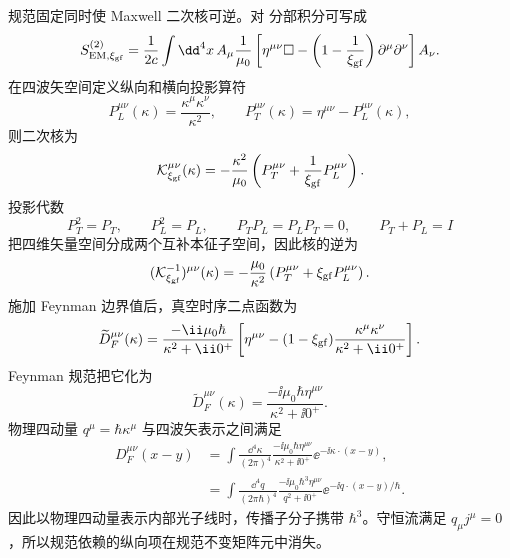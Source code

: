 规范固定同时使 Maxwell 二次核可逆。对 分部积分可写成
\begin{equation}
 S_{\rm EM,\xi_{\rm gf}}^{(2)}
 =\frac1{2c}\int\dd^4 x\,
 A_\mu\frac1{\mu_0}
 \left[
 \eta^{\mu\nu}\Box
 -\left(1-\frac1{\xi_{\rm gf}}\right)
 \partial^\mu\partial^\nu
 \right]A_\nu.
 \label{eq:maxwell-gf-quadratic-r6}
\end{equation}
在四波矢空间定义纵向和横向投影算符
\begin{equation*}
 P_L^{\mu\nu}(\kappa)=\frac{\kappa^\mu\kappa^\nu}{\kappa^2},
 \qquad
 P_T^{\mu\nu}(\kappa)=\eta^{\mu\nu}-P_L^{\mu\nu}(\kappa),
\end{equation*}
则二次核为
\begin{equation}
 {
 \mathcal K_{\xi_{\rm gf}}^{\mu\nu}(\kappa)
 =-\frac{\kappa^2}{\mu_0}
 \left(P_T^{\mu\nu}+\frac1{\xi_{\rm gf}}P_L^{\mu\nu}\right).}
 \label{eq:maxwell-kernel-projectors-r6}
\end{equation}
投影代数
\begin{equation}
 P_T^2=P_T,
 \qquad
 P_L^2=P_L,
 \qquad
 P_TP_L=P_LP_T=0,
 \qquad
 P_T+P_L=I
 \label{eq:maxwell-projector-algebra-r13}
\end{equation}
把四维矢量空间分成两个互补本征子空间，因此核的逆为
\begin{equation}
 {
 (\mathcal K_{\xi_{\rm gf}}^{-1})^{\mu\nu}(\kappa)
 =-\frac{\mu_0}{\kappa^2}
 \left(P_T^{\mu\nu}+\xi_{\rm gf}P_L^{\mu\nu}\right).}
 \label{eq:maxwell-kernel-inverse-r6}
\end{equation}
施加 Feynman 边界值后，真空时序二点函数为
\begin{equation}
 {
 \widetilde D_F^{\mu\nu}(\kappa)
 =\frac{-\ii\mu_0\hbar}{\kappa^2+\ii0^+}
 \left[
 \eta^{\mu\nu}-(1-\xi_{\rm gf})
 \frac{\kappa^\mu\kappa^\nu}{\kappa^2+\ii0^+}
 \right].}
 \label{eq:photon-prop-xi-r2}
\end{equation}
Feynman 规范把它化为
\begin{equation}
 {
 \widetilde D_F^{\mu\nu}(\kappa)
 =\frac{-\ii\mu_0\hbar\eta^{\mu\nu}}
 {\kappa^2+\ii0^+}.}
 \label{eq:photon-prop-feynman-r2}
\end{equation}
物理四动量 $q^\mu=\hbar\kappa^\mu$ 与四波矢表示之间满足
\begin{equation}
 {
 \begin{aligned}
 D_F^{\mu\nu}(x-y)
 &=\int\frac{\dd^4 \kappa}{(2\pi)^4}
 \frac{-\ii\mu_0\hbar\eta^{\mu\nu}}
 {\kappa^2+\ii0^+}\ee^{-\ii\kappa\cdot(x-y)},\\
 &=\int\frac{\dd^4 q}{(2\pi\hbar)^4}
 \frac{-\ii\mu_0\hbar^3\eta^{\mu\nu}}
 {q^2+\ii0^+}\ee^{-\ii q\cdot(x-y)/\hbar}.
 \end{aligned}}
 \label{eq:photon-prop-kappa-to-q-r13}
\end{equation}
因此以物理四动量表示内部光子线时，传播子分子携带 $\hbar^3$。守恒流满足 $q_\mu j^\mu=0$，所以规范依赖的纵向项在规范不变矩阵元中消失。

